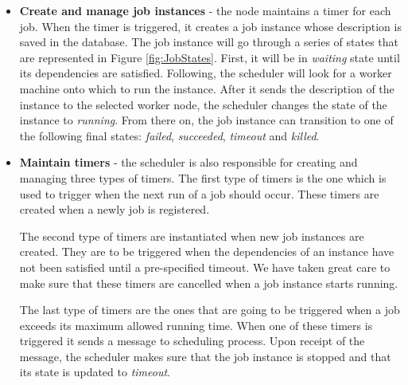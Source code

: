 \documentclass[11pt,a4paper,twoside]{report}
\begin{document}
\begin{itemize}
\item{}
\textbf{Create and manage job instances} - the node maintains a timer for each job. When the timer is triggered, it creates a job instance whose description is saved in the database. The job instance will go through a series of states that are represented in Figure \ref{fig:JobStates}. First, it will be in \textit{waiting} state until its dependencies are satisfied. Following, the scheduler will look for a worker machine onto which to run the instance. After it sends the description of the instance to the selected worker node, the scheduler changes the state of the instance to \textit{running}. From there on, the job instance can transition to one of the following final states: \textit{failed}, \textit{succeeded}, \textit{timeout} and \textit{killed}.
\item{}
\textbf{Maintain timers} - the scheduler is also responsible for creating and managing three types of timers. The first type of timers is the one which is used to trigger when the next run of a job should occur. These timers are created when a newly job is registered.


The second type of timers are instantiated when new job instances are created. They are to be triggered when the dependencies of an instance have not been satisfied until a pre-specified timeout. We have taken great care to make sure that these timers are cancelled when a job instance starts running.


The last type of timers are the ones that are going to be triggered when a job exceeds its maximum allowed running time. When one of these timers is triggered it sends a message to scheduling process. Upon receipt of the message, the scheduler makes sure that the job instance is stopped and that its state is updated to \textit{timeout}.



\end{itemize}
\end{document}
